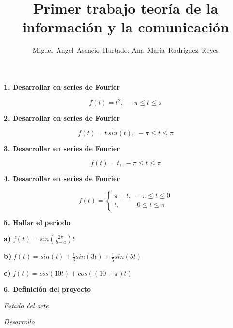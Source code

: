 \documentclass[twocolumn]{article}
\title{Primer trabajo teoría de la información y la comunicación}
\author{Miguel~Angel~Asencio~Hurtado, Ana~María~Rodríguez~Reyes}
\begin{document}
\maketitle
\textbf{1. Desarrollar en series de Fourier}

$$f(t) = t^2,\; -\pi \leq t \leq \pi$$

\textbf{2. Desarrollar en series de Fourier}

$$f(t) = t \, sin(t),\; -\pi \leq t \leq \pi$$

\textbf{3. Desarrollar en series de Fourier}

$$f(t) = t,\; -\pi \leq t \leq \pi$$

\textbf{4. Desarrollar en series de Fourier}

$$f(t) = \begin{cases}
\pi +t, &-\pi \leq t \leq 0\\
t, &0 \leq t \leq \pi
\end{cases}$$

\textbf{5. Hallar el periodo}

\textbf{a)} $f(t) = sin(\frac{2\pi}{b-a})t$

\textbf{b)} $f(t) = sin(t) + \frac{1}{3}sin(3t) + \frac{1}{5}sin(5t)$

\textbf{c)} $f(t) = cos(10t) + cos((10+\pi)t)$

\textbf{6. Definición del proyecto}

\textit{Estado del arte}

\textit{Desarrollo}
\end{document}

